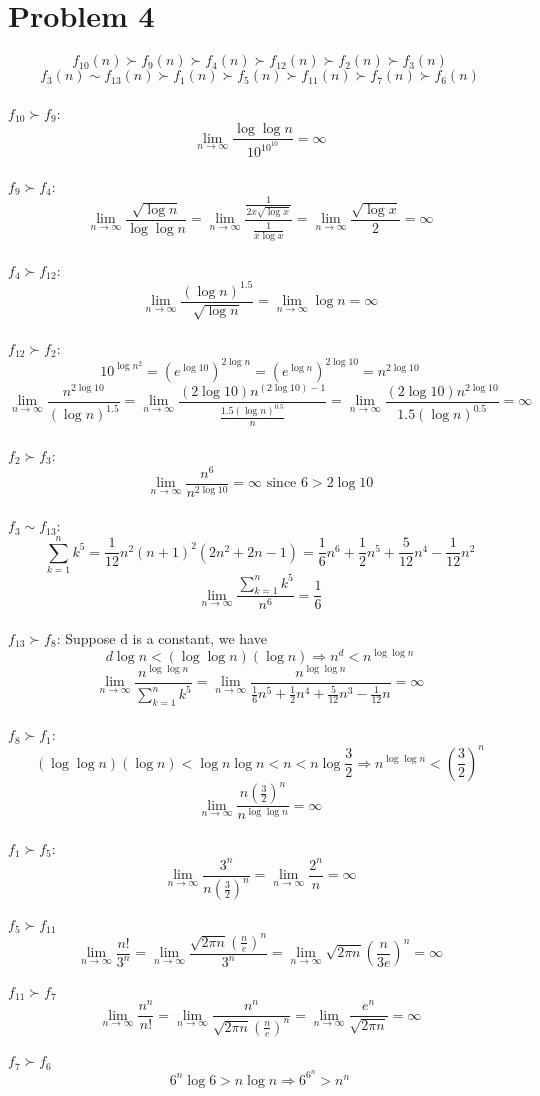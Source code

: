 \documentclass[12pt,a4paper]{article}
\begin{document}
\section*{Problem 4}

\[
    f_{10}(n) \succ f_{9}(n) \succ f_{4}(n) \succ f_{12}(n) \succ f_{2}(n) \succ f_{3}(n)    
\]
\[
    f_{3}(n) \sim f_{13}(n) \succ f_{1}(n) \succ f_{5}(n) \succ f_{11}(n) \succ f_{7}(n) \succ f_{6}(n)
\]
\\
$f_{10} \succ f_{9}$:
\[
    \lim_{n\to\infty} \frac{\log\log n}{10^{10^10}} = \infty
\]
\\
$f_{9} \succ f_{4}$:
\[
    \lim_{n\to\infty} \frac{\sqrt{\log n}}{\log\log n} = \lim_{n\to\infty} \frac{\frac{1}{2x\sqrt{\log x}}}{\frac{1}{x\log x}} = \lim_{n\to\infty} \frac{\sqrt{\log x}}{2} = \infty
\]
\\
$f_{4} \succ f_{12}$:
\[
    \lim_{n\to\infty} \frac{(\log n)^{1.5}}{\sqrt{\log n}} = \lim_{n\to\infty} \log n = \infty
\]
\\
$f_{12} \succ f_{2}$:
\[
    10^{\log n^2} = (e^{\log10})^{2\log n} = (e^{\log n})^{2\log 10}= n^{2\log 10}
\]
\[
    \lim_{n\to\infty} \frac{n^{2\log 10}}{(\log n)^{1.5}} = \lim_{n\to\infty} \frac{(2\log 10) n^{(2\log 10) - 1}}{\frac{1.5(\log n)^{0.5}}{n}} = \lim_{n\to\infty} \frac{(2\log 10) n^{2\log 10}}{1.5(\log n)^{0.5}} = \infty
\]
\\
$f_{2} \succ f_{3}$:
\[
    \lim_{n\to\infty} \frac{n^6}{n^{2\log 10}} = \infty \text{ since } 6 > 2\log 10
\]
\\
$f_{3} \sim f_{13}$:
\[
    \sum_{k = 1}^{n} k^5 = \frac{1}{12} n^2 (n + 1)^2 (2n^2 + 2n - 1) = \frac{1}{6} n^6 + \frac{1}{2} n^5 + \frac{5}{12} n^4 - \frac{1}{12} n^2
\]
\[
    \lim_{n\to\infty} \frac{\sum_{k = 1}^{n} k^5}{n^6} = \frac{1}{6}
\]
\\
$f_{13} \succ f_{8}$:
Suppose d is a constant, we have
\[
    d \log n < (\log \log n) (\log n) \Rightarrow n^{d} < n^{\log\log n}
\]
\[
    \lim_{n\to\infty} \frac{n^{\log\log n}}{\sum_{k = 1}^{n} k^5} = \lim_{n\to\infty} \frac{n^{\log\log n}}{\frac{1}{6} n^5 + \frac{1}{2} n^4 + \frac{5}{12} n^3 - \frac{1}{12} n} = \infty
\]
\\
$f_{8} \succ f_{1}$:
\[
    (\log \log n) (\log n) < \log n \log n < n < n \log \frac{3}{2} \Rightarrow n^{\log\log n} < (\frac{3}{2})^n
\]
\[
    \lim_{n\to\infty} \frac{n(\frac{3}{2})^n}{n^{\log\log n}} = \infty
\]
\\
$f_{1} \succ f_{5}$:
\[
    \lim_{n\to\infty} \frac{3^n}{n(\frac{3}{2})^n} = \lim_{n\to\infty} \frac{2^n}{n} = \infty
\]
\\
$f_{5} \succ f_{11}$
\[
    \lim_{n\to\infty} \frac{n!}{3^n} = \lim_{n\to\infty} \frac{\sqrt{2\pi n}\left(\frac{n}{e}\right)^{n}}{3^n} = \lim_{n\to\infty}  \sqrt{2\pi n}\left(\frac{n}{3e}\right)^{n} = \infty
\]
\\
$f_{11} \succ f_{7}$
\[
    \lim_{n\to\infty} \frac{n^n}{n!} = \lim_{n\to\infty} \frac{n^n}{\sqrt{2\pi n}\left(\frac{n}{e}\right)^{n}} = \lim_{n\to\infty} \frac{e^{n}}{\sqrt{2\pi n}} = \infty
\]
\\
$f_{7} \succ f_{6}$
\[
    6^{n} \log 6 > n \log n \Rightarrow 6^{6^n} > n^{n} 
\]
\end{document}

